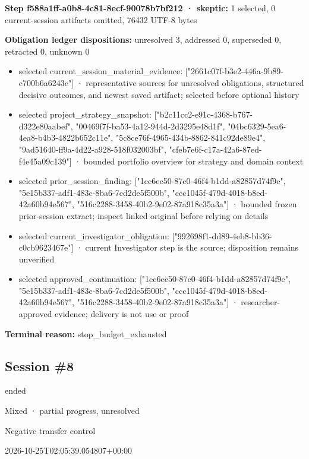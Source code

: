 \documentclass[11pt]{article}
\begin{document}
\textbf{Step f588a1ff-a0b8-4c81-8ecf-90078b7bf212 · skeptic:} 1 selected, 0 current-session artifacts omitted, 76432 UTF-8 bytes\par
\textbf{Obligation ledger dispositions:} unresolved 3, addressed 0, superseded 0, retracted 0, unknown 0\par
\begin{itemize}
\item selected current\_session\_material\_evidence: ["2661c07f-b3e2-446a-9b89-c700b6a6243e"] · representative sources for unresolved obligations, structured decisive outcomes, and newest saved artifact; selected before optional history
\item selected project\_strategy\_snapshot: ["b2c11cc2-e91c-4368-b767-d322e80aabef", "00469f7f-ba53-4a12-944d-2d3295e48d1f", "04bc6329-5ea6-4ea8-b4b3-4822b652c11e", "5c8ce76f-4965-434b-8862-841c92de89e4", "9ad51640-ff9a-4d22-a928-518f032003bf", "cfeb7e6f-c17a-42a6-87ed-f4e45a09c139"] · bounded portfolio overview for strategy and domain context
\item selected prior\_session\_finding: ["1cc6ec50-87c0-46f4-b1dd-a82857d74f9e", "5e15b337-adf1-483c-8ba6-7cd2de5f500b", "ccc1045f-479d-4018-b8ed-42a60b94e567", "516c2288-3458-40b2-9e02-87a918c35a3a"] · bounded frozen prior-session extract; inspect linked original before relying on details
\item selected current\_investigator\_obligation: ["992698f1-dd89-4eb8-bb36-c0cb9623467e"] · current Investigator step is the source; disposition remains unverified
\item selected approved\_continuation: ["1cc6ec50-87c0-46f4-b1dd-a82857d74f9e", "5e15b337-adf1-483c-8ba6-7cd2de5f500b", "ccc1045f-479d-4018-b8ed-42a60b94e567", "516c2288-3458-40b2-9e02-87a918c35a3a"] · researcher-approved evidence; delivery is not use or proof
\end{itemize}
\textbf{Terminal reason:} stop\_budget\_exhausted\par
\subsection{Session \#8}
\begin{description}[style=nextline,font=\normalfont\bfseries,leftmargin=0pt,labelsep=0pt]
\item[Execution status] ended
\item[Outcome] Mixed · partial progress, unresolved
\item[Strategy] Negative transfer control
\item[Started] 2026-10-25T02:05:39.054807+00:00
\end{description}
\end{document}
